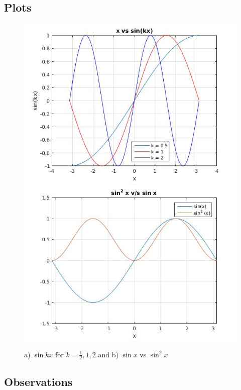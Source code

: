 \documentclass{article}
\begin{document}
\subsection{Plots}
\begin{figure}[!h]
    \centering
    \includegraphics[scale = 0.4]{5}
    \includegraphics[scale = 0.4]{5point5.jpg}
    \caption{a) $\sin{kx}$ for $k = \frac{1}{2}, 1, 2$ and b) $\sin{x}$ vs $\sin^2{x}$}
    \label{fig:sinx}
\end{figure}

\subsection{Observations}
\end{document}
